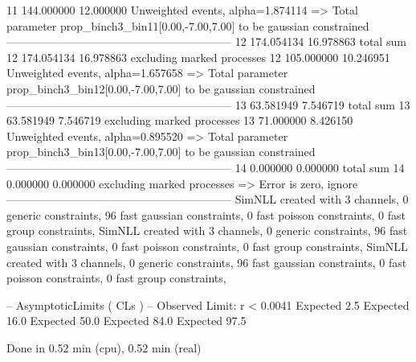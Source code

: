 11         144.000000      12.000000       Unweighted events, alpha=1.874114
  => Total parameter prop_binch3_bin11[0.00,-7.00,7.00] to be gaussian constrained
------------------------------------------------------------
12         174.054134      16.978863       total sum                     
12         174.054134      16.978863       excluding marked processes    
12         105.000000      10.246951       Unweighted events, alpha=1.657658
  => Total parameter prop_binch3_bin12[0.00,-7.00,7.00] to be gaussian constrained
------------------------------------------------------------
13         63.581949       7.546719        total sum                     
13         63.581949       7.546719        excluding marked processes    
13         71.000000       8.426150        Unweighted events, alpha=0.895520
  => Total parameter prop_binch3_bin13[0.00,-7.00,7.00] to be gaussian constrained
------------------------------------------------------------
14         0.000000        0.000000        total sum                     
14         0.000000        0.000000        excluding marked processes    
  => Error is zero, ignore      
------------------------------------------------------------
SimNLL created with 3 channels, 0 generic constraints, 96 fast gaussian constraints, 0 fast poisson constraints, 0 fast group constraints, 
SimNLL created with 3 channels, 0 generic constraints, 96 fast gaussian constraints, 0 fast poisson constraints, 0 fast group constraints, 
SimNLL created with 3 channels, 0 generic constraints, 96 fast gaussian constraints, 0 fast poisson constraints, 0 fast group constraints, 

 -- AsymptoticLimits ( CLs ) --
Observed Limit: r < 0.0041
Expected  2.5%
Expected 16.0%
Expected 50.0%
Expected 84.0%
Expected 97.5%

Done in 0.52 min (cpu), 0.52 min (real)
